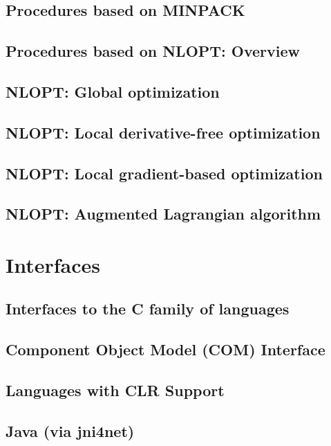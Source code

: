 \documentclass[12pt,a4paper,openany]{book}
\begin{document}
\section{Procedures based on MINPACK}

\section{Procedures based on NLOPT: Overview}

\section{NLOPT: Global optimization}

\section{NLOPT: Local derivative-free optimization}

\section{NLOPT: Local gradient-based optimization}

\section{NLOPT: Augmented Lagrangian algorithm}

\chapter{Interfaces}

\section{Interfaces to the C family of languages}

\section{Component Object Model (COM) Interface}

\section{Languages with CLR Support}

\section{Java (via jni4net)}
\end{document}
